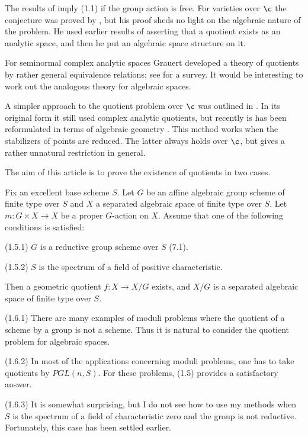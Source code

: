 The results of \cite{Artin74} imply (1.1)  if the group
action is free. For varieties over $\c$ the conjecture was proved by
\cite{Popp73}, but his proof sheds no light on the algebraic nature of the
problem. He used  earlier results of \cite{Holman63; Kaup68} asserting that a
quotient exists as an analytic space, and then he  put an
algebraic space structure on it.

For seminormal complex analytic spaces Grauert developed a theory of
quotients by rather general equivalence relations; see
\cite{Dethloff-Grauert94} for a survey.  It would be interesting to work out
the analogous theory for algebraic spaces.

A simpler approach to the quotient problem over $\c$ was outlined in
\cite{Mumford-Fogarty82, p.172}. In its original form it still used complex
analytic quotients, but recently is has been reformulated in terms of
algebraic geometry \cite{Keel94; Viehweg95, 9.16}.  This method works  when
the stabilizers of points are reduced. The latter   always holds over $\c$, but
gives a  rather unnatural restriction  in general.
\enddemo

The aim of this article is to prove the existence of quotients in two cases.


 Fix an excellent base scheme $S$. Let  $G$ be an affine
algebraic group scheme   of finite type  over $S$ and $X$ a separated
algebraic space   of finite type  over $S$. Let $m:G\times X\to X$ be a proper
$G$-action on $X$. Assume that one of the following conditions is satisfied:

(1.5.1) $G$ is a reductive group scheme over $S$ (7.1).

(1.5.2) $S$ is the spectrum of a field of positive characteristic.
\smallpagebreak

\noindent Then a geometric quotient $f:X\to X/G$  exists, and $X/G$ is a
 separated
algebraic
space  of finite type over $S$.
\endproclaim


  (1.6.1) There are many examples of moduli problems where
the quotient of a scheme by a group is not a scheme. Thus it is natural to
consider the quotient problem for algebraic spaces.

(1.6.2) In most of the applications concerning moduli
problems, one has to take quotients by $PGL(n,S)$.  For these problems,
(1.5) provides a  satisfactory answer.

(1.6.3) It is somewhat surprising, but I do not see how to use my methods
when $S$ is the spectrum of a field of   characteristic zero and the group is
not reductive. Fortunately, this case has been settled earlier.
\enddemo


